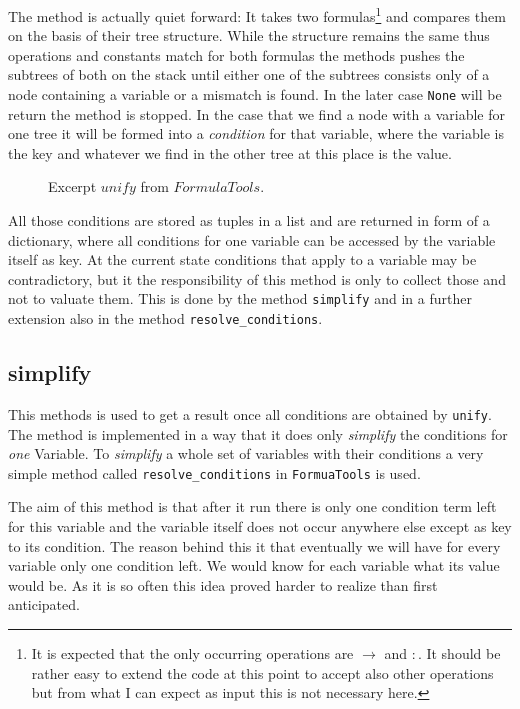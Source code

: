 The method is actually quiet forward: It takes two formulas\footnote{It is expected that the only occurring operations are $\rightarrow$ and $:$. It should be rather easy to extend the code at this point to accept also other operations but from what I can expect as input this is not necessary here.} and compares them on the basis of their tree structure. While the structure remains the same thus operations and constants match for both formulas the methods pushes the subtrees of both on the stack until either one of the subtrees consists only of a node containing a variable or a mismatch is found. In the later case \texttt{None} will be return the method is stopped. In the case that we find a node with a variable for one tree it will be formed into a \emph{condition} for that variable, where the variable is the key and whatever we find in the other tree at this place is the value.

\begin{figure}[H]
	\vspace{-10pt}
	
	\vspace{-10pt}
	\caption{Excerpt $unify$ from $FormulaTools$.}
	\vspace{-10pt}
\end{figure}

All those conditions are stored as tuples in a list and are returned in form of a dictionary, where all conditions for one variable can be accessed by the variable itself as key. At the current state conditions that apply to a variable may be contradictory, but it the responsibility of this method is only to collect those and not to valuate them. This is done by the method \texttt{simplify} and in a further extension also in the method \texttt{resolve\_conditions}.


\subsection{simplify}
This methods is used to get a result once all conditions are obtained by \texttt{unify}. The method is implemented in a way that it does only \emph{simplify} the conditions for \emph{one} Variable. To \emph{simplify} a whole set of variables with their conditions a very simple method called \texttt{resolve\_conditions} in \texttt{FormuaTools} is used. 

The aim of this method is that after it run there is only one condition term left for this variable and the variable itself does not occur anywhere else except as key to its condition. The reason behind this it that eventually we will have for every variable only one condition left. We would know for each variable what its value would be. As it is so often this idea proved harder to realize than first anticipated.

